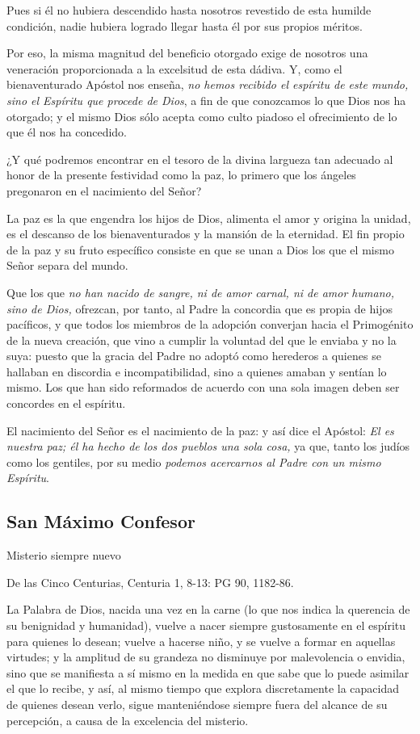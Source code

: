 \begin{body}
\begin{body}
Pues si él no hubiera descendido hasta nosotros revestido de esta humilde condición, nadie hubiera logrado llegar hasta él por sus propios méritos.

Por eso, la misma magnitud del beneficio otorgado exige de nosotros una veneración proporcionada a la excelsitud de esta dádiva. Y, como el bienaventurado Apóstol nos enseña, \emph{no hemos recibido el espíritu de este mundo, sino el Espíritu que procede de Dios}, a fin de que conozcamos lo que Dios nos ha otorgado; y el mismo Dios sólo acepta como culto piadoso el ofrecimiento de lo que él nos ha concedido.

¿Y qué podremos encontrar en el tesoro de la divina largueza tan adecuado al honor de la presente festividad como la paz, lo primero que los ángeles pregonaron en el nacimiento del Señor?

La paz es la que engendra los hijos de Dios, alimenta el amor y origina la unidad, es el descanso de los bienaventurados y la mansión de la eternidad. El fin propio de la paz y su fruto específico consiste en que se unan a Dios los que el mismo Señor separa del mundo.

Que los que \emph{no han nacido de sangre, ni de amor carnal, ni de amor humano, sino de Dios,} ofrezcan, por tanto, al Padre la concordia que es propia de hijos pacíficos, y que todos los miembros de la adopción converjan hacia el Primogénito de la nueva creación, que vino a cumplir la voluntad del que le enviaba y no la suya: puesto que la gracia del Padre no adoptó como herederos a quienes se hallaban en discordia e incompatibilidad, sino a quienes amaban y sentían lo mismo. Los que han sido reformados de acuerdo con una sola imagen deben ser concordes en el espíritu.

El nacimiento del Señor es el nacimiento de la paz: y así dice el Apóstol: \emph{El es nuestra paz; él ha hecho de los dos pueblos una sola cosa,} ya que, tanto los judíos como los gentiles, por su medio \emph{podemos acercarnos al Padre con un mismo Espíritu}.

\subsection{San Máximo Confesor}

Misterio siempre nuevo

De las Cinco Centurias, Centuria 1, 8-13: PG 90, 1182-86.

La Palabra de Dios, nacida una vez en la carne (lo que nos indica la querencia de su benignidad y humanidad), vuelve a nacer siempre gustosamente en el espíritu para quienes lo desean; vuelve a hacerse niño, y se vuelve a formar en aquellas virtudes; y la amplitud de su grandeza no disminuye por malevolencia o envidia, sino que se manifiesta a sí mismo en la medida en que sabe que lo puede asimilar el que lo recibe, y así, al mismo tiempo que explora discretamente la capacidad de quienes desean verlo, sigue manteniéndose siempre fuera del alcance de su percepción, a causa de la excelencia del misterio.


\end{body}
\end{body}
